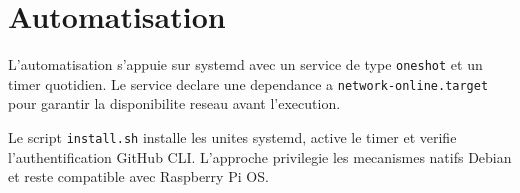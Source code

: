 \section{Automatisation}
L'automatisation s'appuie sur systemd avec un service de type \texttt{oneshot} et un
timer quotidien. Le service declare une dependance a \texttt{network-online.target}
pour garantir la disponibilite reseau avant l'execution.

Le script \texttt{install.sh} installe les unites systemd, active le timer et
verifie l'authentification GitHub CLI. L'approche privilegie les mecanismes natifs
Debian et reste compatible avec Raspberry Pi OS.
